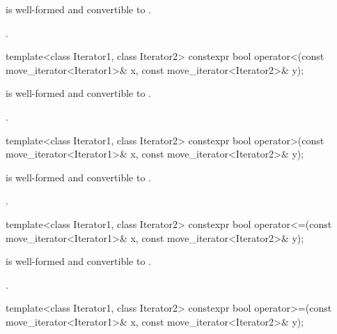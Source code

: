\begin{itemdescr}
\pnum
\constraints
{} is well-formed and
convertible to .

\pnum
\returns
{}.
\end{itemdescr}

%
\begin{itemdecl}
template<class Iterator1, class Iterator2>
constexpr bool operator<(const move_iterator<Iterator1>& x, const move_iterator<Iterator2>& y);
\end{itemdecl}

\begin{itemdescr}
\pnum
\constraints
{} is well-formed and
convertible to .

\pnum
\returns
{}.
\end{itemdescr}

%
\begin{itemdecl}
template<class Iterator1, class Iterator2>
constexpr bool operator>(const move_iterator<Iterator1>& x, const move_iterator<Iterator2>& y);
\end{itemdecl}

\begin{itemdescr}
\pnum
\constraints
{} is well-formed and
convertible to .

\pnum
\returns
{}.
\end{itemdescr}

%
\begin{itemdecl}
template<class Iterator1, class Iterator2>
constexpr bool operator<=(const move_iterator<Iterator1>& x, const move_iterator<Iterator2>& y);
\end{itemdecl}

\begin{itemdescr}
\pnum
\constraints
{} is well-formed and
convertible to .

\pnum
\returns
{}.
\end{itemdescr}

%
\begin{itemdecl}
template<class Iterator1, class Iterator2>
constexpr bool operator>=(const move_iterator<Iterator1>& x, const move_iterator<Iterator2>& y);
\end{itemdecl}

